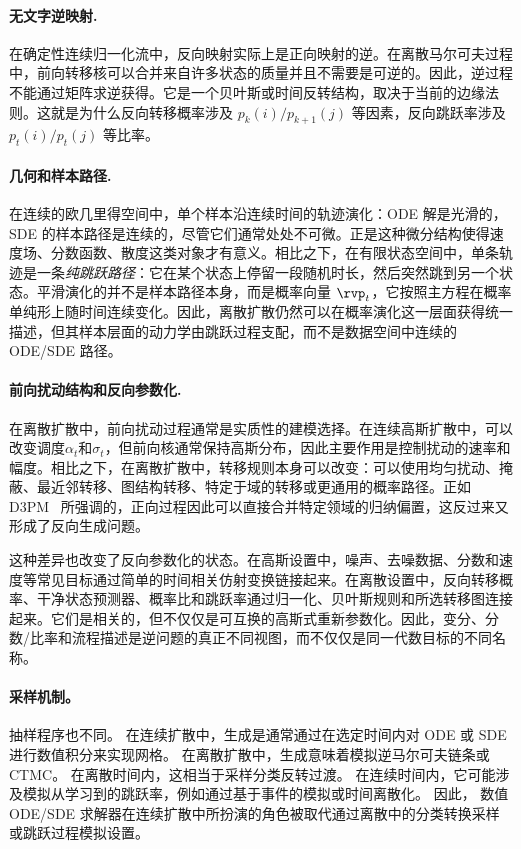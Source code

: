 \paragraph{无文字逆映射.}
在确定性连续归一化流中，反向映射实际上是正向映射的逆。在离散马尔可夫过程中，前向转移核可以合并来自许多状态的质量并且不需要是可逆的。因此，逆过程不能通过矩阵求逆获得。它是一个贝叶斯或时间反转结构，取决于当前的边缘法则。这就是为什么反向转移概率涉及 $p_k(i)/p_{k+1}(j)$ 等因素，反向跳跃率涉及 $p_t(i)/p_t(j)$ 等比率。\paragraph{几何和样本路径.}
在连续的欧几里得空间中，单个样本沿连续时间的轨迹演化：ODE 解是光滑的，SDE 的样本路径是连续的，尽管它们通常处处不可微。正是这种微分结构使得速度场、分数函数、散度这类对象才有意义。相比之下，在有限状态空间中，单条轨迹是一条\emph{纯跳跃路径}：它在某个状态上停留一段随机时长，然后突然跳到另一个状态。平滑演化的并不是样本路径本身，而是概率向量 $\rvp_t$，它按照主方程在概率单纯形上随时间连续变化。因此，离散扩散仍然可以在概率演化这一层面获得统一描述，但其样本层面的动力学由跳跃过程支配，而不是数据空间中连续的 ODE/SDE 路径。

\paragraph{前向扰动结构和反向参数化.}
在离散扩散中，前向扰动过程通常是实质性的建模选择。在连续高斯扩散中，可以改变调度$\alpha_t$和$\sigma_t$，但前向核通常保持高斯分布，因此主要作用是控制扰动的速率和幅度。相比之下，在离散扩散中，转移规则本身可以改变：可以使用均匀扰动、掩蔽、最近邻转移、图结构转移、特定于域的转移或更通用的概率路径。正如 D3PM~\citep{austin2021structured} 所强调的，正向过程因此可以直接合并特定领域的归纳偏置，这反过来又形成了反向生成问题。

这种差异也改变了反向参数化的状态。在高斯设置中，噪声、去噪数据、分数和速度等常见目标通过简单的时间相关仿射变换链接起来。在离散设置中，反向转移概率、干净状态预测器、概率比和跳跃率通过归一化、贝叶斯规则和所选转移图连接起来。它们是相关的，但不仅仅是可互换的高斯式重新参数化。因此，变分、分数/比率和流程描述是逆问题的真正不同视图，而不仅仅是同一代数目标的不同名称。\paragraph{采样机制。}
抽样程序也不同。  在连续扩散中，生成是通常通过在选定时间内对 ODE 或 SDE 进行数值积分来实现网格。  在离散扩散中，生成意味着模拟逆马尔可夫链条或 CTMC\@。  在离散时间内，这相当于采样分类反转过渡。  在连续时间内，它可能涉及模拟从学习到的跳跃率，例如通过基于事件的模拟或时间离散化。  因此，
数值 ODE/SDE 求解器在连续扩散中所扮演的角色被取代通过离散中的分类转换采样或跳跃过程模拟设置。


